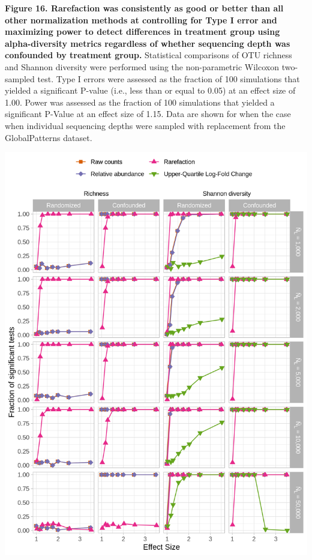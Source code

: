 \documentclass[
]{article}
\begin{document}
\textbf{Figure 16. Rarefaction was consistently as good or better than
all other normalization methods at controlling for Type I error and
maximizing power to detect differences in treatment group using
alpha-diversity metrics regardless of whether sequencing depth was
confounded by treatment group.} Statistical comparisons of OTU richness
and Shannon diversity were performed using the non-parametric Wilcoxon
two-sampled test. Type I errors were assessed as the fraction of 100
simulations that yielded a significant P-value (i.e., less than or equal
to 0.05) at an effect size of 1.00. Power was assessed as the fraction
of 100 simulations that yielded a significant P-Value at an effect size
of 1.15. Data are shown for when the case when individual sequencing
depths were sampled with replacement from the GlobalPatterns dataset.

\newpage

\includegraphics{figure_17.png}
\end{document}
